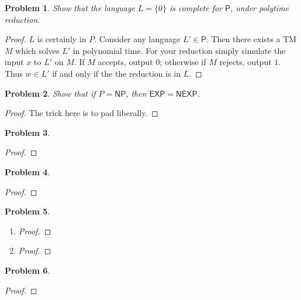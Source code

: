 \documentclass[11pt]{article}
\def\P{\mathsf{P}}
\def\NP{\mathsf{NP}}
\def\EXP{\mathsf{EXP}}
\def\NEXP{\mathsf{NEXP}}
\newtheorem{problem}{Problem}
\begin{document}
\begin{problem}
Show that the language $L = \{0\}$ is complete for $\P$, under polytime reduction.
\end{problem}
\begin{proof}
$L$ is certainly in $P$. Consider any language $L' \in \P$. Then there exists a TM $M$ which solves $L'$ in polynomial time. For your reduction simply simulate the input $x$ to $L'$ on $M$. If $M$ accepts, output $0$; otherwise if $M$ rejects, output $1$. Thus $w \in L'$ if and only if the the reduction is in $L$. 
\end{proof}



\begin{problem}
Show that if $P = \NP$, then $\EXP = \NEXP$.
\end{problem}
\begin{proof}
The trick here is to pad liberally. 
\end{proof}



\begin{problem}

\end{problem}

\begin{proof}

\end{proof}

\begin{problem}

\end{problem}
\begin{proof}

\end{proof}



\begin{problem}

\end{problem}
\begin{enumerate}
\item 
\begin{proof}

\end{proof}
\item
\begin{proof}

\end{proof}
\end{enumerate}



\begin{problem}

\end{problem}
\begin{proof}

\end{proof}
\end{document}
